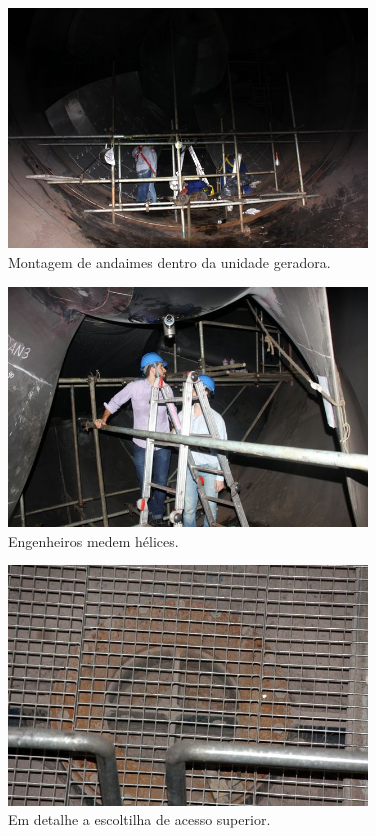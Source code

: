 \documentclass{article}
\begin{document}
\begin{figure}[H]
\centering
\includegraphics[width=0.85\textwidth]{Fotos/img_4931.jpg}
\caption{Montagem de andaimes dentro da unidade geradora.}
\end{figure}

\begin{figure}[H]
\centering
\includegraphics[width=0.85\textwidth]{Fotos/img_4966.jpg}
\caption{Engenheiros medem hélices.}
\end{figure}

\begin{figure}[H]
\centering
\includegraphics[width=0.85\textwidth]{Fotos/img_4978.jpg}
\caption{Em detalhe a escoltilha de acesso superior.}
\end{figure}
\end{document}
